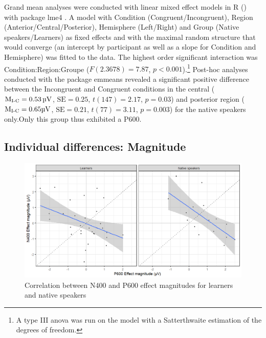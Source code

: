 \documentclass[output=paper,colorlinks,citecolor=brown,modfonts,nonflat]{../langscibook}
\begin{document}
Grand mean analyses were conducted with linear mixed effect models in R (\citealt{RCoreTeam2019}) with package lme4 \citep{BatesEtAl2015}. A model with Condition (Congruent\slash Incongruent), Region (Anterior\slash Central\slash Posterior), Hemisphere (Left\slash Right) and Group (Native speakers\slash Learners) as fixed effects and with the maximal random structure that would converge (an intercept by participant as well as a slope for Condition and Hemisphere) was fitted to the data. The highest order significant interaction was Condition:Region:Groupe ($F(2.3678) = 7.87$, $p < 0.001$).\footnote{A type III anova was run on the model with a Satterthwaite estimation of the degrees of freedom.} Post-hoc analyses conducted with the package emmeans \citep{Lenth2019} revealed a significant positive difference between the Incongruent and Congruent conditions in the central ($\text{M\textsubscript{I-C}} = 0.53 \text{\,µV}$, $\text{SE} = 0.25$, $t(147) = 2.17$, $p = 0.03$) and posterior region ($\text{M\textsubscript{I-C}} = 0.65 \text{µV}$, $\text{SE} = 0.21$, $t(77) = 3.11$, $p = 0.003$) for the native speakers only.Only this group thus exhibited a P600.

\subsection{Individual differences: Magnitude}

\begin{figure}
\includegraphics[width=\textwidth]{figures/pelissier-img001.png}
\caption{Correlation between N400 and P600 effect magnitudes for learners and native speakers\label{fig:pelissier:1}}
\end{figure}
\end{document}
